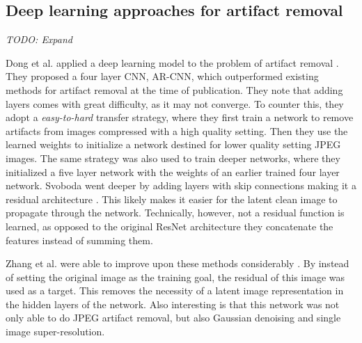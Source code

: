 \subsection{Deep learning approaches for artifact removal}

\textit{TODO: Expand}

Dong et al. applied a deep learning model to the problem of artifact removal \cite{dong2015compression}. They proposed a four layer CNN, AR-CNN, which outperformed existing methods for artifact removal at the time of publication. They note that adding layers comes with great difficulty, as it may not converge. To counter this, they adopt a \emph{easy-to-hard} transfer strategy, where they first train a network to remove artifacts from images compressed with a high quality setting. Then they use the learned weights to initialize a network destined for lower quality setting JPEG images. The same strategy was also used to train deeper networks, where they initialized a five layer network with the weights of an earlier trained four layer network. Svoboda went deeper by adding layers with skip connections making it a residual architecture \cite{svoboda}. This likely makes it easier for the latent clean image to propagate through the network. Technically, however, not a residual function is learned, as opposed to the original ResNet architecture they concatenate the features instead of summing them.

Zhang et al. were able to improve upon these methods considerably \cite{zhang}. By instead of setting the original image as the training goal, the residual of this image was used as a target. This removes the necessity of a latent image representation in the hidden layers of the network. Also interesting is that this network was not only able to do JPEG artifact removal, but also Gaussian denoising and single image super-resolution.

